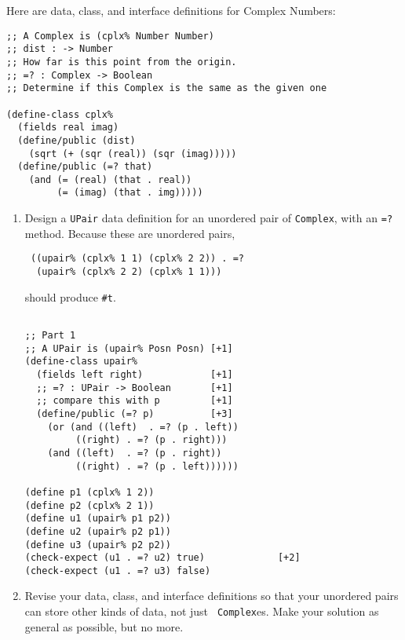 \documentclass[12pt]{article}                   %
\def\pts#1{\marginpar{\footnotesize \raggedright  \fbox{#1 {\sc Points}}}}
\newenvironment{solution}{}{}
\begin{document}
\begin{problem}\pts{20}

Here are data, class, and interface definitions for Complex Numbers:

\begin{verbatim}
;; A Complex is (cplx% Number Number)
;; dist : -> Number
;; How far is this point from the origin.
;; =? : Complex -> Boolean
;; Determine if this Complex is the same as the given one

(define-class cplx%
  (fields real imag)
  (define/public (dist)
    (sqrt (+ (sqr (real)) (sqr (imag)))))
  (define/public (=? that) 
    (and (= (real) (that . real))
         (= (imag) (that . img)))))

\end{verbatim}

\begin{enumerate}
\item Design a {\tt UPair} data definition for an unordered pair of
  {\tt Complex}, with an {\tt =?}  method.  Because these are
  unordered pairs, 

\begin{verbatim}
 ((upair% (cplx% 1 1) (cplx% 2 2)) . =?
  (upair% (cplx% 2 2) (cplx% 1 1)))
\end{verbatim}

should produce {\tt \#t}.

\begin{solution}
\begin{verbatim} 

;; Part 1
;; A UPair is (upair% Posn Posn) [+1]
(define-class upair%
  (fields left right)            [+1]
  ;; =? : UPair -> Boolean       [+1]
  ;; compare this with p         [+1]
  (define/public (=? p)          [+3]
    (or (and ((left)  . =? (p . left))
	     ((right) . =? (p . right)))
	(and ((left)  . =? (p . right))
	     ((right) . =? (p . left))))))

(define p1 (cplx% 1 2))
(define p2 (cplx% 2 1))
(define u1 (upair% p1 p2))
(define u2 (upair% p2 p1))
(define u3 (upair% p2 p2))
(check-expect (u1 . =? u2) true)             [+2]
(check-expect (u1 . =? u3) false)
\end{verbatim}
\end{solution}

\newpage
\item Revise your data, class, and interface definitions so that your
  unordered pairs can store other kinds of data, not just {\tt
    Complex}es.  Make your solution as general as possible, but no more.


\end{enumerate}
\end{problem}
\end{document}
